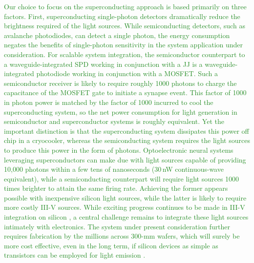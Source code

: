 \documentclass{article}
\begin{document}
\begin{multicols}{2}
\textcolor{ForestGreen}{Our choice to focus on the superconducting approach is based primarily on three factors. First, superconducting single-photon detectors dramatically reduce the brightness required of the light sources. While semiconducting detectors, such as avalanche photodiodes, can detect a single photon, the energy consumption negates the benefits of single-photon sensitivity in the system application under consideration. For scalable system integration, the semiconductor counterpart to a waveguide-integrated SPD working in conjunction with a JJ is a waveguide-integrated photodiode working in conjunction with a MOSFET. Such a semiconductor receiver is likely to require roughly 1000 photons to charge the capacitance of the MOSFET gate \cite{mi2017} to initiate a synapse event. This factor of 1000 in photon power is matched by the factor of 1000 incurred to cool the superconducting system, so the net power consumption for light generation in semiconductor and superconductor systems is roughly equivalent. Yet the important distinction is that the superconducting system dissipates this power off chip in a cryocooler, whereas the semiconducting system requires the light sources to produce this power in the form of photons. Optoelectronic neural systems leveraging superconductors can make due with light sources capable of providing 10,000 photons within a few tens of nanoseconds (30\,nW continuous-wave equivalent), while a semiconducting counterpart will require light sources 1000 times brighter to attain the same firing rate. Achieving the former appears possible with inexpensive silicon light sources, while the latter is likely to require more costly III-V sources. While exciting progress continues to be made in III-V integration on silicon \cite{hala2020}, a central challenge remains to integrate these light sources intimately with electronics. The system under present consideration further requires fabrication by the millions across 300-mm wafers, which will surely be more cost effective, even in the long term, if silicon devices as simple as transistors can be employed for light emission \cite{buch2017}.}


\end{multicols}
\end{document}
